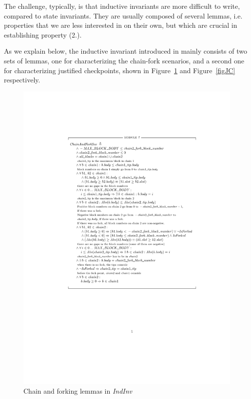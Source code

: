 The challenge, typically, is that inductive invariants are more difficult to write, compared to state invariants.
They are usually composed of several lemmas, i.e. properties that we are less interested in on their own, but which are crucial in establishing property (2.).

As we explain below, the inductive invariant introduced in \SpecFour{} mainly consists of two sets of lemmas, one for characterizing the chain-fork scenarios, and a second one for characterizing justified checkpoints, shown in Figure~\ref{figFork} and Figure~\ref{figJC} respectively.

\begin{figure}
  \includegraphics[width=\textwidth]{images/chain-and-fork-inv.pdf}
  \caption{Chain and forking lemmas in \textit{IndInv}}\label{figFork}
\end{figure}

